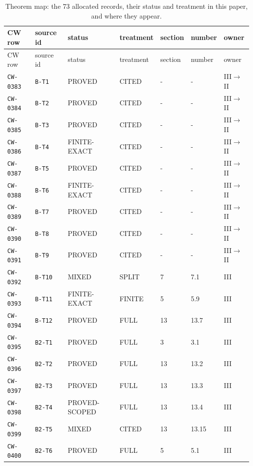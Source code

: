 \begin{center}\scriptsize
\begin{longtable}{@{}lllllll@{}}\caption{Theorem map: the 73 allocated records, their status and treatment in this paper, and where they appear.}\label{tab:map}\\\toprule
CW row & source id & status & treatment & section & number & owner\\\midrule
\endfirsthead
\toprule
CW row & source id & status & treatment & section & number & owner\\\midrule
\endhead
\texttt{CW-0383} & \texttt{B-T1} & PROVED & CITED & - & - & III$\to$II\\
\texttt{CW-0384} & \texttt{B-T2} & PROVED & CITED & - & - & III$\to$II\\
\texttt{CW-0385} & \texttt{B-T3} & PROVED & CITED & - & - & III$\to$II\\
\texttt{CW-0386} & \texttt{B-T4} & FINITE-EXACT & CITED & - & - & III$\to$II\\
\texttt{CW-0387} & \texttt{B-T5} & PROVED & CITED & - & - & III$\to$II\\
\texttt{CW-0388} & \texttt{B-T6} & FINITE-EXACT & CITED & - & - & III$\to$II\\
\texttt{CW-0389} & \texttt{B-T7} & PROVED & CITED & - & - & III$\to$II\\
\texttt{CW-0390} & \texttt{B-T8} & PROVED & CITED & - & - & III$\to$II\\
\texttt{CW-0391} & \texttt{B-T9} & PROVED & CITED & - & - & III$\to$II\\
\texttt{CW-0392} & \texttt{B-T10} & MIXED & SPLIT & 7 & 7.1 & III\\
\texttt{CW-0393} & \texttt{B-T11} & FINITE-EXACT & FINITE & 5 & 5.9 & III\\
\texttt{CW-0394} & \texttt{B-T12} & PROVED & FULL & 13 & 13.7 & III\\
\texttt{CW-0395} & \texttt{B2-T1} & PROVED & FULL & 3 & 3.1 & III\\
\texttt{CW-0396} & \texttt{B2-T2} & PROVED & FULL & 13 & 13.2 & III\\
\texttt{CW-0397} & \texttt{B2-T3} & PROVED & FULL & 13 & 13.3 & III\\
\texttt{CW-0398} & \texttt{B2-T4} & PROVED-SCOPED & FULL & 13 & 13.4 & III\\
\texttt{CW-0399} & \texttt{B2-T5} & MIXED & CITED & 13 & 13.15 & III\\
\texttt{CW-0400} & \texttt{B2-T6} & PROVED & FULL & 5 & 5.1 & III\\

\end{longtable}
\end{center}
